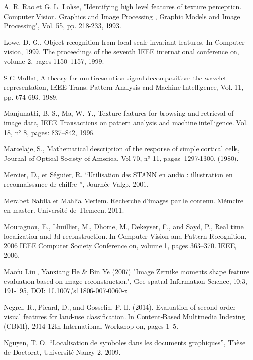 \documentclass[
openany,
11pt, %
french, %
singlespacing, %
headsepline, %
]{MastersDoctoralThesis} %
\begin{document}
\begin{thebibliography}{widest entry}
	 A. R. Rao et G. L. Lohse, "Identifying high level features of texture perception. Computer Vision, Graphics and Image Processing , Graphic Models and Image Processing", Vol. 55, pp. 218-233, 1993.
	
	  Lowe, D. G., Object recognition from local scale-invariant features. In Computer vision, 1999. The proceedings of the seventh IEEE international conference on, volume 2, pages 1150–1157, 1999.
	
	 S.G.Mallat, A theory for multiresolution signal decomposition: the wavelet representation, IEEE Trans. Pattern Analysis and Machine Intelligence, Vol. 11, pp. 674-693, 1989.
	
	 Manjunathi, B. S., Ma, W. Y., Texture features for browsing and retrieval of image data, IEEE Transactions on pattern analysis and machine intelligence. Vol. 18, n° 8, pages: 837–842, 1996.
	
	 Marcelaje, S., Mathematical description of the response of simple cortical cells, Journal of Optical Society of America. Vol 70, n° 11, pages: 1297-1300, (1980).
	
	
	 Mercier, D., et Séguier, R. “Utilisation des STANN en audio : illustration en reconnaissance de chiffre ”, Journée Valgo. 2001.
	
	 Merabet Nabila et Mahlia Meriem. Recherche d’images par le contenu. Mémoire en master. Université de Tlemcen. 2011.
	
	 Mouragnon, E., Lhuillier, M., Dhome, M., Dekeyser, F., and Sayd, P., Real time localization and 3d reconstruction. In Computer Vision and Pattern Recognition, 2006 IEEE Computer Society Conference on, volume 1, pages 363–370. IEEE, 2006.
	
	 Maofu Liu , Yanxiang He \& Bin Ye (2007) "Image Zernike moments shape feature evaluation based on image reconstruction", Geo-spatial Information Science, 10:3, 191-195, DOI: 10.1007/s11806-007-0060-x
	
	 Negrel, R., Picard, D., and Gosselin, P.-H. (2014). Evaluation of second-order visual features for land-use classification. In Content-Based Multimedia Indexing (CBMI), 2014 12th International Workshop on, pages 1–5.
	
	 Nguyen, T. O. “Localisation de symboles dans les documents graphiques”, Thèse de Doctorat, Université Nancy 2. 2009.
	

\end{thebibliography}
\end{document}

